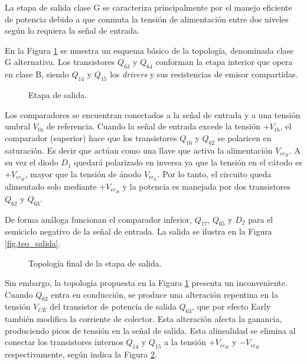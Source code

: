	La etapa de salida clase G se caracteriza principalmente por el manejo eficiente de potencia debido a que conmuta la tensión de alimentación entre dos niveles según lo requiera la señal de entrada.

	En la Figura \ref{fig.salida} se muestra un esquema básico de la topología, denominada clase G alternativa.  Los transistores $Q_{63}$ y $Q_{64}$ conforman la etapa interior que opera en clase B, siendo $Q_{14}$ y $Q_{15}$ los \textit{drivers} y sus resistencias de emisor compartidas. 

	\begin{figure}[H]
		\centering
		\scalebox{0.5}{}
		\caption{Etapa de salida.}
		\label{fig.salida}
	\end{figure}

	Los comparadores se encuentran conectados a la señal de entrada y a una tensión umbral $V_{th}$ de referencia. Cuando la señal de entrada excede la tensión $+V_{th}$, el comparador (superior) hace que los transistores $Q_{16}$ y $Q_{62}$ se polaricen en saturación. Es decir que actúan como una llave que activa la alimentación $V_{cc_H}$. A su vez el diodo $D_1$ quedará polarizado en inversa ya que la tensión en el cátodo es $+V_{cc_H}$, mayor que la tensión de ánodo $V_{cc_L}$. Por lo tanto, el circuito queda alimentado solo mediante $+V_{cc_H}$ y la potencia es manejada por dos transistores $Q_{62}$ y $Q_{63}$.

	De forma análoga funcionan el comparador inferior, $Q_{17}$, $Q_{65}$ y $D_2$ para el semiciclo negativo de la señal de entrada. La salida se ilustra en la Figura \ref{fig.teo_salida}.


	\begin{figure}[H]
		\centering
		\scalebox{0.5}{}
		\caption{Topología final de la etapa de salida.}
		\label{fig.salida_2}
	\end{figure}
	Sin embargo, la topología propuesta en la Figura \ref{fig.salida} presenta un inconveniente. Cuando $Q_{62}$ entra en conducción, se produce una alteración repentina en la tensión $V_{CE}$ del transistor de potencia de salida $Q_63$, que por efecto Early también modifica la corriente de colector. Esta alteración afecta la ganancia, produciendo picos de tensión en la señal de salida. Esta alinealidad se elimina al conectar los transistores internos $Q_{14}$ y $Q_{15}$ a la tensión $+V_{cc_H}$ y $-V_{cc_H}$ respectivamente, según indica la Figura \ref{fig.salida_2}.

